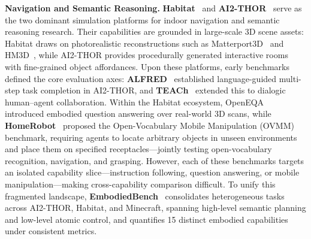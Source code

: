 \documentclass[acmsmall,screen,review,anonymous]{acmart}
\begin{document}
\textbf{Navigation and Semantic Reasoning.} \textbf{Habitat}~\cite{szot2022habitat20} and \textbf{AI2-THOR}~\cite{kolve2022ai2thor} serve as the two dominant simulation platforms for indoor navigation and semantic reasoning research. Their capabilities are grounded in large-scale 3D scene assets: Habitat draws on photorealistic reconstructions such as Matterport3D~\cite{chang2017matterport3d} and HM3D~\cite{ramakrishnan2021hm3d}, while AI2-THOR provides procedurally generated interactive rooms with fine-grained object affordances. Upon these platforms, early benchmarks defined the core evaluation axes: \textbf{ALFRED}~\cite{shridhar2020alfred} established language-guided multi-step task completion in AI2-THOR, and \textbf{TEACh}~\cite{padmakumar2022teach} extended this to dialogic human--agent collaboration. Within the Habitat ecosystem, OpenEQA~\cite{majumdar2024openeqa} introduced embodied question answering over real-world 3D scans, while \textbf{HomeRobot}~\cite{yenamandra2023homerobot} proposed the Open-Vocabulary Mobile Manipulation (OVMM) benchmark, requiring agents to locate arbitrary objects in unseen environments and place them on specified receptacles---jointly testing open-vocabulary recognition, navigation, and grasping. However, each of these benchmarks targets an isolated capability slice---instruction following, question answering, or mobile manipulation---making cross-capability comparison difficult. To unify this fragmented landscape, \textbf{EmbodiedBench}~\cite{yang2025embodiedbench} consolidates heterogeneous tasks across AI2-THOR, Habitat, and Minecraft, spanning high-level semantic planning and low-level atomic control, and quantifies 15 distinct embodied capabilities under consistent metrics.
\end{document}

